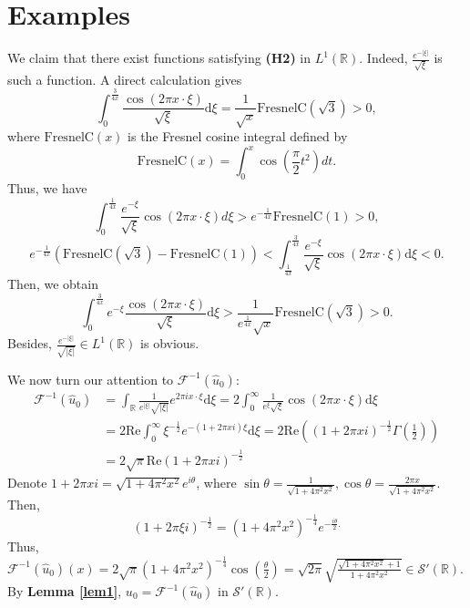 \documentclass[12pt]{article}
\newcommand{\R}{\mathbb{R}}
\newcommand{\dd}{\mathrm{d}}
\begin{document}
\section{Examples}

We claim that there exist functions satisfying \textbf{(H2)} in \(L^1(\R)\). Indeed, \(\frac{e^{-|\xi|}}{\sqrt{\xi}}\) is such a function. A direct calculation gives
\[\int_0^{\frac{3}{{4x}}} {\frac{{\cos \left( {2\pi x \cdot \xi } \right)}}{{\sqrt \xi  }}\dd\xi  = \frac{1}{{\sqrt x }}} \mathrm{FresnelC}\left( {\sqrt 3 } \right) > 0,\]
where \(\mathrm{FresnelC}(x)\) is the Fresnel cosine integral defined by
\[\mathrm{FresnelC}(x)= \int_0^x {\cos \left( {\frac{\pi }{2}{t^2}} \right)} dt.\]
Thus, we have
\[\int_0^{\frac{1}{{4x}}} {\frac{{{e^{ - \xi }}}}{{\sqrt \xi  }}} \cos \left( {2\pi x \cdot \xi } \right)d\xi  > {e^{ - \frac{1}{{4x}}}}\mathrm{FresnelC}(1)>0,\]
\[ {e^{ - \frac{1}{{4x}}}}\left( {\mathrm{FresnelC}(\sqrt 3 ) - \mathrm{FresnelC}(1)} \right)<\int_{\frac{1}{{4x}}}^{\frac{3}{{4x}}} {\frac{{{e^{ - \xi }}}}{{\sqrt \xi  }}} \cos \left( {2\pi x \cdot \xi } \right)\dd\xi<0 .\] 
Then, we obtain
\[\int_0^{\frac{3}{{4x}}} {e^{ - \xi }\frac{{\cos \left( {2\pi x \cdot \xi } \right)}}{{\sqrt \xi  }}\dd\xi>\frac{1}{{e^{\frac{1}{{4x}}}\sqrt x }}} \mathrm{FresnelC}\left( {\sqrt 3 } \right) > 0.\]
Besides, \(\frac{e^{-|\xi|}}{\sqrt{|\xi|}}\in L^1(\R)\) is obvious.

We now turn our attention to \(\mathscr{F}^{-1}(\hat{u}_0)\):
\begin{align*}
	\mathscr{F}^{-1}(\hat{u}_0)&=\int_\R {\frac{1}{{{e^{  \left| \xi  \right|}}\sqrt {\left| \xi  \right|} }}} {e^{2\pi ix \cdot \xi }}\dd\xi  = 2\int_0^\infty   {\frac{1}{{{e^\xi}\sqrt {\xi} }}} \cos(2\pi x\cdot \xi)\dd\xi \\
	 & =2\mathrm{Re}\int_0^\infty \xi^{-\frac{1}{2}} e^{-(1+2\pi xi)\xi}\dd\xi=2\mathrm{Re}\left((1+2\pi x i)^{-\frac{1}{2}}\Gamma\left( \frac{1}{2}\right)  \right)\\
	 &=2\sqrt{\pi} \mathrm{Re}(1+2\pi x i)^{-\frac{1}{2}}
\end{align*}
Denote \(1+2\pi x i=\sqrt{1+4\pi^2x^2}e^{i\theta}\), where \(\sin\theta=\frac{1}{\sqrt{1+4\pi^2 x^2}},  \cos\theta=\frac{2\pi x}{\sqrt{1+4\pi^2x^2}}\). Then,
\[(1+2\pi \xi i)^{-\frac{1}{2}}=(1+4\pi^2x^2)^{-\frac{1}{4}}e^{-\frac{i\theta}{2}.}\]
Thus, \(\mathscr{F}^{-1}(\hat{u}_0)(x)=2\sqrt{\pi}(1+4\pi^2x^2)^{-\frac{1}{4}}\cos(\frac{\theta}{2})=\sqrt{2\pi}\sqrt{\frac{\sqrt{1+4\pi^2x^2}+1}{1+4\pi^2x^2}}\in \mathscr{S}'(\R).\) By \textbf{Lemma \ref{lem1}}, \(u_0=\mathscr{F}^{-1}(\hat{u}_0)\) in \(\mathscr{S}'(\R).\)
\end{document}

